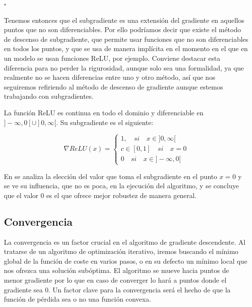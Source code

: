 \begin{flushright}
    $\square$
\end{flushright} 





Tenemos entonces que el subgradiente es una extensión del gradiente en aquellos puntos que no son diferenciables. Por ello podríamos decir que existe el método de descenso de subgradiente, que permite usar funciones que no son diferenciables en todos los puntos, y que se usa de manera implícita en el momento en el que en un modelo se usan funciones ReLU, por ejemplo. Conviene destacar esta diferencia para no perder la rigurosidad, aunque solo sea una formalidad, ya que realmente no se hacen diferencias entre uno y otro método, así que nos seguiremos refiriendo al método de descenso de gradiente aunque estemos trabajando con subgradientes.

\begin{ejemplo}\label{ej:RELUsub}
     La función ReLU es continua en todo el dominio y diferenciable en $]-\infty,0[ \cup ]0,\infty[$. Su subgradiente es el siguiente:

    $$ \nabla ReLU(x)=\left\{\begin{matrix}
1, \quad si \quad x \in ]0,\infty[ \\
c \in [0,1] \quad si \quad x=0\\
0 \quad si \quad x \in ]-\infty,0[
\end{matrix}\right.$$
\end{ejemplo}

 En \cite{ReLuat0} se analiza la elección del valor que toma el subgradiente en el punto $x=0$ y se ve su influencia, que no es poca, en la ejecución del algoritmo, y se concluye que el valor 0 es el que ofrece mejor robustez de manera general.




\subsection{Convergencia} \label{sec:convergencia}

La convergencia es un factor crucial en el algoritmo de gradiente descendente. Al tratarse de un algoritmo de optimización iterativo, iremos buscando el mínimo global de la función de coste en varios pasos, o en su defecto un mínimo local que nos ofrezca una solución subóptima. El algoritmo se mueve hacia puntos de menor gradiente por lo que en caso de converger lo hará a puntos donde el gradiente sea 0. Un factor clave para la convergencia será el hecho de que la función de pérdida sea o no una función convexa.


